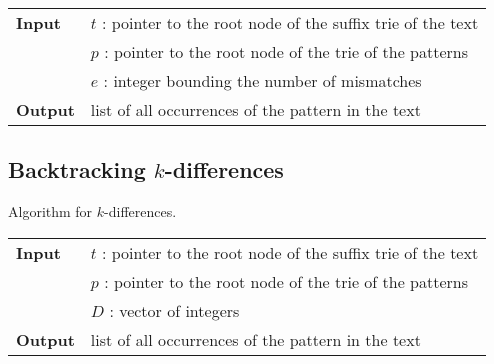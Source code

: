 \begin{center}
\begin{minipage}[t]{.8\textwidth}
\begin{algorithm}[H]
\begin{tabular}{ll}
\textbf{Input}  & $t$ : pointer to the root node of the suffix trie of the text\\
 			    & $p$ : pointer to the root node of the trie of the patterns\\
 			    & $e$ : integer bounding the number of mismatches\\
\textbf{Output} & list of all occurrences of the pattern in the text\\
\end{tabular}
\begin{algorithmic}[1]
		\State \Report {}
		\Repeat
			\State {}
			\State {}
			\State {}
		\Until {}
	\EndIf
\EndIf
\end{algorithmic}
\label{alg:st-hamming}
\end{algorithm}
\end{minipage}
\end{center}

\subsection{Backtracking $k$-differences}

Algorithm for $k$-differences.

\begin{center}
\begin{minipage}[t]{.8\textwidth}
\begin{algorithm}[H]
\begin{tabular}{ll}
\textbf{Input}  & $t$ : pointer to the root node of the suffix trie of the text\\
 			    & $p$ : pointer to the root node of the trie of the patterns\\
 			    & $D$ : vector of integers\\
\textbf{Output} & list of all occurrences of the pattern in the text\\
\end{tabular}
\begin{algorithmic}[1]
	\State \Report {}
		\Repeat
			\State {}
	\EndIf
\EndIf
\end{algorithmic}
\label{alg:st-edit}
\end{algorithm}
\end{minipage}
\end{center}

